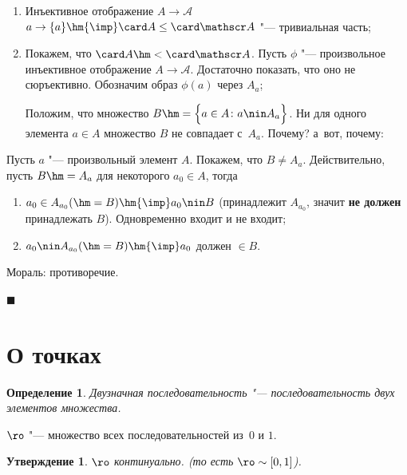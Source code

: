 \documentclass[a4paper,10pt,twoside]{article}
\newtheorem{Def}{Определение}[section]
\newtheorem{Ut}{Утверждение}[section]
\newenvironment{Proof}
       {\par\noindent{\textbf{Доказательство.}}}
       {\hfill$\scriptstyle\blacksquare$}
\let\AVsection\section{}
\renewcommand\section{\newpage\scol\AVsection}
\newcommand{\scol}{  \renewcommand{\headrulewidth}{0.5pt}\fancyhead[RE,LO]{\thesection{} \leftmark} \fancyhead[LE,RO]{\thepage}}
\begin{document}
\begin{Proof}
    \begin{enumerate}
        \item Инъективное отображение $A\to \mathscr A$\pau $a\to\{a\}\hm{\imp}\card A\leq\card \mathscr A$ "--- тривиальная часть;

        \item Покажем, что $\card A\hm<\card\mathscr A$. Пусть $\phi$ "--- произвольное инъективное отображение $A\to \mathscr A$. Достаточно показать, что оно не сюръективно.
            Обозначим образ $\phi(a)$ через $A_a$;

            Положим, что множество $B\hm=\Big\{a\in A\colon a\nin A_a\Big\}$. Ни для одного элемента $a\in A$ множество $B$ не совпадает с~$A_a$. Почему? а~вот, почему:
    \end{enumerate}

            Пусть $a$ "--- произвольный элемент $A$. Покажем, что $B\neq A_a$. Действительно, пусть $B\hm=A_a$ для некоторого $a_0\in A$, тогда

            \begin{enumerate}
                \item $a_0\in A_{a_0}(\hm=B)\hm{\imp} a_0\nin B$ (принадлежит $A_{a_0}$, значит \textbf{не должен} принадлежать $B$). Одновременно входит и не входит;

                \item $a_0 \nin A_{a_0}(\hm=B) \hm{\imp} a_0$ должен $\in B$.
            \end{enumerate}

            Мораль: противоречие.

\end{Proof}

\section{О точках}
\begin{Def}
    Двузначная последовательность "--- последовательность двух элементов множества.
\end{Def}

$\ro$ "--- множество всех последовательностей из~$0$ и $1$.

\begin{Ut}
    $\ro$ континуально. (то есть $\ro\sim[0,1]$).
\end{Ut}
\end{document}
